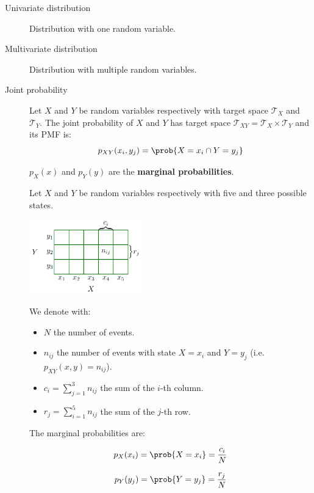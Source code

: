 \begin{description}
    \item[Univariate distribution] 
        Distribution with one random variable.
    
    \item[Multivariate distribution] 
        Distribution with multiple random variables.
    
    \item[Joint probability] 
        Let $X$ and $Y$ be random variables respectively with target space $\mathcal{T}_X$ and $\mathcal{T}_Y$.
        The joint probability of $X$ and $Y$ has target space $\mathcal{T}_{XY} = \mathcal{T}_X \times \mathcal{T}_Y$
        and its PMF is:
        \[ p_{XY}(x_i, y_j) = \prob{X = x_i \cap Y = y_j} \]

        $p_X(x)$ and $p_Y(y)$ are the \textbf{marginal probabilities}. 

        \begin{example}
            Let $X$ and $Y$ be random variables respectively with five and three possible states.
            \begin{center}
                \includegraphics[width=0.4\textwidth]{img/_joint_probability_example.pdf}
            \end{center}
            We denote with:
            \begin{itemize}
                \item $N$ the number of events.
                \item $n_{ij}$ the number of events with state $X=x_i$ and $Y=y_j$ (i.e. $p_{XY}(x, y) = n_{ij}$).
                \item $c_i = \sum_{j=1}^{3} n_{ij}$ the sum of the $i$-th column.
                \item $r_j = \sum_{i=1}^{5} n_{ij}$ the sum of the $j$-th row.
            \end{itemize}

            The marginal probabilities are:\\
            \begin{minipage}{.48\linewidth}
                \centering
                \[ p_X(x_i) = \prob{X = x_i} = \frac{c_i}{N} \]
            \end{minipage}
            \begin{minipage}{.48\linewidth}
                \centering
                \[ p_Y(y_j) = \prob{Y = y_j} = \frac{r_j}{N} \]
            \end{minipage}


\end{example}
\end{description}
